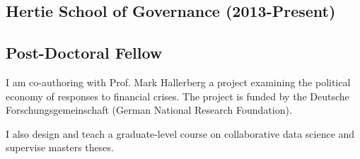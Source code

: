 \documentclass[a4paper]{article}
\begin{document}
\subsection*{Hertie School of Governance (2013-Present)}

\subsection*{Post-Doctoral Fellow}

I am co-authoring with Prof. Mark Hallerberg a project examining the political economy of responses to financial crises. The project is funded by the Deutsche Forschungsgemeinschaft (German National Research Foundation).\vspace{0.25cm}

\noindent I also design and teach a graduate-level course on collaborative data science and supervise masters theses.
\end{document}
